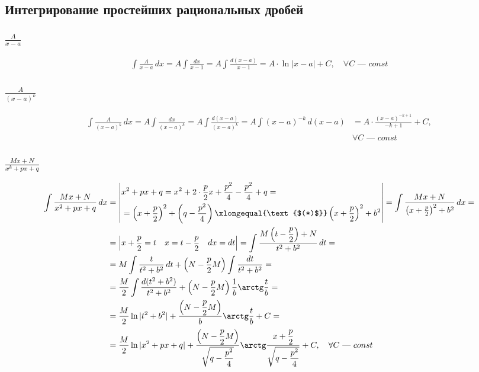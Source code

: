 \subsection{Интегрирование простейших рациональных дробей}
\subsubsection{$\frac{A}{x - a}$}

\begin{align*}
    \int \frac{A}{x - a}\, dx = A \int \frac{dx}{x - 1} = A \int \frac{d(x - a)}{x - 1} = A \cdot \ln |x - a| + C,\quad \forall C \text{ --- } const
\end{align*}

\subsubsection{$\frac{A}{(x-a)^k}$}

\begin{align*}
    \int \frac{A}{(x - a)^k}\, dx = A \int \frac{dx}{(x-a)^k} = A \int \frac{d(x-a)}{(x-a)^k} = A \int (x - a)^{-k}\, d(x-a) &= A\cdot \frac{(x - a)^{-k + 1}}{-k + 1} + C, \\
    & \forall C \text{ --- } const
\end{align*}

\newpage
\subsubsection{$\frac{Mx + N}{x^k + px + q}$}

\begin{align*}
    \int \frac{Mx + N}{x^2 + px + q}\, dx &= \left| \begin{aligned}
        & x^2 + px + q = x^2 + 2\cdot \frac{p}{2}x + \frac{p^2}{4} - \frac{p^2}{4} + q = \\
        & = \left(x + \frac{p}{2}\right)^2 + \left(q - \frac{p^2}{4}\right) \xlongequal{\text{$(*)$}} \left(x + \frac{p}{2}\right)^2  + b^2
    \end{aligned} \right| = \int \frac{Mx + N}{\left(x + \frac{p}{2}\right)^2 + b^2}\, dx = \\
     &= \left| x + \frac{p}{2} = t\quad x = t - \frac{p}{2}\quad dx = dt \right| = \int \frac{M \left(t - \dfrac{p}{2}\right) + N}{t^2 + b^2}\, dt = \\
     &=M \int \frac{t}{t^2 + b^2}\, dt + \left(N - \frac{p}{2}M\right) \int \frac{dt}{t^2 + b^2} = \\
     &= \frac{M}{2} \int \frac{d(t^2 + b^2)}{t^2 + b^2} + \left(N - \frac{p}{2}M\right) \frac{1}{b}\arctg \frac{t}{b} = \\
     &= \frac{M}{2} \ln |t^2 + b^2| + \frac{\left(N - \dfrac{p}{2}M\right)}{b} \arctg \frac{t}{b} + C = \\[0.5ex]
     &= \frac{M}{2} \ln |x^2 + px + q| + \frac{\left( N - \dfrac{p}{2}M\right)}{\sqrt{q - \dfrac{p^2}{4}}}\arctg \frac{x + \dfrac{p}{2}}{\sqrt{q - \dfrac{p^2}{4}}} + C,\quad \forall C \text{ --- } const
\end{align*}

